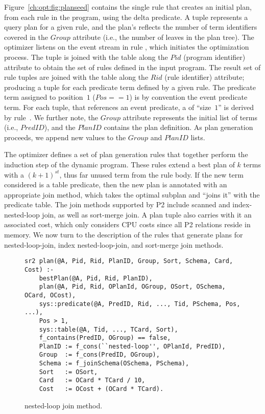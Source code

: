 Figure~\ref{ch:opt:fig:planseed} contains the single rule that creates an
initial plan, from each rule in the program, using the delta predicate.  A
 tuple represents a query plan for a given rule, and the plan's
 reflects the number of term identifiers covered in the $Group$
attribute (i.e., the number of leaves in the plan tree).  The optimizer listens
on the  event stream in rule , which
initiates the optimization process.  The  tuple is
joined with the  table along the $Pid$ (program identifier)
attribute to obtain the set of rules defined in the input program.  The result
set of rule tuples are joined with the  table along the
$Rid$ (rule identifier) attribute; producing a tuple for each predicate term
defined by a given rule.  The predicate term assigned to position~$1$ ($Pos ==
1$) is by convention the event predicate term.  For each 
tuple, that references an event predicate, a  of ``size~$1$'' is
derived by rule~.  We further note, the $Group$ attribute represents
the initial list of terms (i.e., $PredID$), and the $PlanID$ contains the plan
definition.  As plan generation proceeds, we append new values to the $Group$
and $PlanID$ lists.

The \OVERLOG optimizer defines a set of plan generation rules that together
perform the induction step of the dynamic program.  These rules extend a best
plan of $k$ terms with a $(k+1)^{st}$, thus far unused term from the rule body.
If the new term considered is a table predicate, then the new plan is annotated
with an appropriate join method, which takes the optimal subplan and ``joins
it'' with the predicate table.  The join methods supported by P2 include
scanned and index-nested-loop join, as well as sort-merge join.  A plan tuple
also carries with it an associated cost, which only considers CPU costs since
all P2 relations reside in memory.  We now turn to the description of the rules
that generate plans for nested-loop-join, index nested-loop-join, and
sort-merge join methods.

\begin{figure*}
\ssp
\centering
\begin{lstlisting}
sr2 plan(@A, Pid, Rid, PlanID, Group, Sort, Schema, Card, Cost) :- 
    bestPlan(@A, Pid, Rid, PlanID),
    plan(@A, Pid, Rid, OPlanId, OGroup, OSort, OSchema, OCard, OCost),
    sys::predicate(@A, PredID, Rid, ..., Tid, PSchema, Pos, ...),
    Pos > 1,
    sys::table(@A, Tid, ..., TCard, Sort),
    f_contains(PredID, OGroup) == false,
    PlanID := f_cons(``nested-loop'', OPlanId, PredID),
    Group  := f_cons(PredID, OGroup),
    Schema := f_joinSchema(OSchema, PSchema),
    Sort   := OSort,
    Card   := OCard * TCard / 10,
    Cost   := OCost + (OCard * TCard).
\end{lstlisting}
\caption{\label{ch:opt:fig:plangen1}nested-loop join method.}
\end{figure*}

